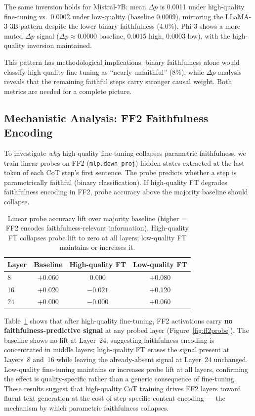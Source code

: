 \documentclass[11pt]{article}
\begin{document}
The same inversion holds for Mistral-7B: mean $\Delta p$ is
0.0011 under high-quality fine-tuning vs.\ 0.0002 under low-quality (baseline
0.0009), mirroring the LLaMA-3-3B pattern despite the lower binary faithfulness
(4.0\%). Phi-3
shows a more muted $\Delta p$ signal ($\Delta p \approx 0.0000$ baseline,
0.0015 high, 0.0003 low), with the high-quality inversion maintained.

This pattern has methodological implications: binary faithfulness alone would
classify high-quality fine-tuning as ``nearly unfaithful'' (8\%), while
$\Delta p$ analysis reveals that the remaining faithful steps carry stronger
causal weight. Both metrics are needed for a complete picture.

\subsection{Mechanistic Analysis: FF2 Faithfulness Encoding}
\label{sec:ff2}

To investigate \emph{why} high-quality fine-tuning collapses parametric
faithfulness, we train linear probes on FF2 (\texttt{mlp.down\_proj}) hidden
states extracted at the last token of each CoT step's first sentence.
The probe predicts whether a step is parametrically faithful (binary
classification). If high-quality FT degrades faithfulness encoding in FF2,
probe accuracy above the majority baseline should collapse.

\begin{table}[h]
\centering
\caption{Linear probe accuracy lift over majority baseline
(higher = FF2 encodes faithfulness-relevant information).
High-quality FT collapses probe lift to zero at all layers;
low-quality FT maintains or increases it.}
\label{tab:ff2}
\begin{tabular}{lccc}
\toprule
Layer & Baseline & High-quality FT & Low-quality FT \\
\midrule
8  & $+$0.060 & $\mathbf{0.000}$  & $+$0.080 \\
16 & $+$0.020 & $\mathbf{-0.021}$ & $+$0.120 \\
24 & $+$0.000 & $\mathbf{-0.000}$ & $+$0.060 \\
\bottomrule
\end{tabular}
\end{table}

Table~\ref{tab:ff2} shows that after high-quality fine-tuning, FF2 activations
carry \textbf{no faithfulness-predictive signal} at any probed layer
(Figure~\ref{fig:ff2probe}).
The baseline shows no lift at Layer~24, suggesting faithfulness encoding is
concentrated in middle layers; high-quality FT erases the signal present at
Layers~8 and~16 while leaving the already-absent signal at Layer~24 unchanged.
Low-quality fine-tuning maintains or increases probe lift at all layers,
confirming the effect is quality-specific rather than a generic consequence
of fine-tuning. These results suggest that high-quality CoT training drives
FF2 layers toward fluent text generation at the cost of step-specific content
encoding --- the mechanism by which parametric faithfulness collapses.
\end{document}
